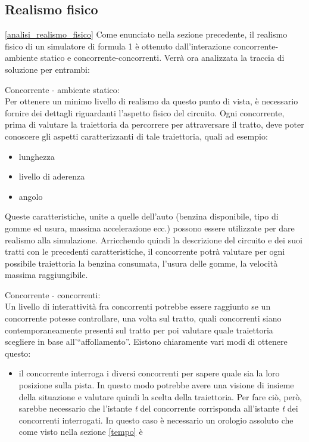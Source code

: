 \subsection{Realismo fisico}
\ref{analisi_realismo_fisico}
Come enunciato nella sezione precedente, il realismo fisico di un simulatore di
formula 1 è ottenuto dall'interazione
concorrente-ambiente statico e concorrente-concorrenti. Verrà ora analizzata la
traccia di soluzione per entrambi:
\begin{description}
\item{Concorrente - ambiente statico:}\\
Per ottenere un minimo livello di realismo da questo punto di vista, è
necessario fornire dei dettagli riguardanti l'aspetto fisico
del circuito. Ogni concorrente, prima di valutare la traiettoria da percorrere
per attraversare il tratto, deve poter conoscere
gli aspetti caratterizzanti di tale traiettoria, quali ad esempio:
\begin{itemize}
\item lunghezza 
\item livello di aderenza
\item angolo
\end{itemize}
Queste caratteristiche, unite a quelle dell'auto (benzina disponibile, tipo di
gomme ed usura, massima accelerazione ecc.)
possono essere utilizzate per dare realismo alla simulazione.
Arricchendo quindi la descrizione del circuito e dei suoi tratti con le
precedenti caratteristiche, il concorrente potrà
valutare per ogni possibile traiettoria la benzina consumata, l'usura delle
gomme, la velocità massima raggiungibile.
\item{Concorrente - concorrenti:}\\
Un livello di interattività fra concorrenti potrebbe essere raggiunto se 
un concorrente potesse controllare, una volta sul tratto, quali concorrenti
siano contemporaneamente presenti sul tratto
per poi valutare quale traiettoria scegliere in base all'``affollamento''.
Eistono chiaramente vari modi di ottenere questo:
\begin{itemize}
\item il concorrente interroga i diversi concorrenti per sapere quale sia la
loro posizione sulla pista. In questo modo potrebbe
avere una visione di insieme della situazione e valutare quindi la scelta della
traiettoria. Per fare ciò, però, sarebbe 
necessario che l'istante \emph{t} del concorrente corrisponda all'istante
\emph{t} dei concorrenti interrogati. In questo caso
è necessario un orologio assoluto che come visto nella sezione \ref{tempo} è

\end{itemize}
\end{description}
